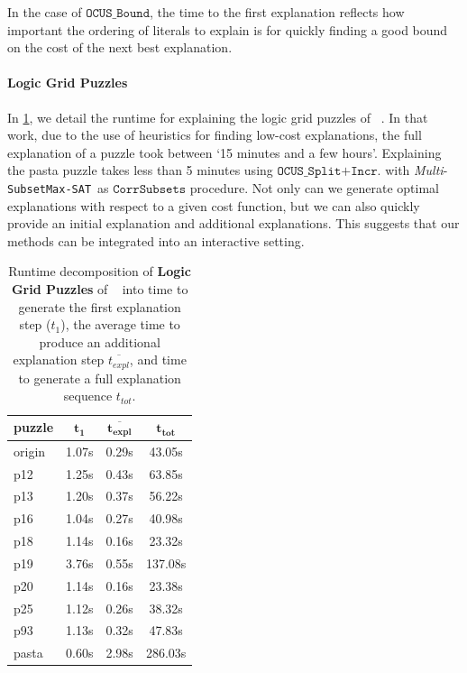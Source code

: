 \documentclass[twoside,11pt]{article}
\newcommand\citet[1]{\citeauthor{#1}~\citeyear{#1}}
\newcommand\mm[1]{\ensuremath{#1}\xspace}
\newcommand\call[1]{\mm{\texttt{#1}}}
\newcommand\subsetmaxsat{\texttt{SubsetMax-SAT}}
\newcommand{\comusbound}{\mm{\call{OCUS\_Bound}}}
\newcommand\ousbiterincr{\mm{\call{OCUS\_Split+Incr.}}}
\newcommand\corrsubsets{\mm{\call{CorrSubsets}}}
\begin{document}
In the case of \emph{\comusbound}, the time to the first explanation reflects how important the ordering of literals to explain is for quickly finding a good bound on the cost of the next best explanation. 

\paragraph{Logic Grid Puzzles} In \cref{tab:indiv-explanations-logic-grid-puzzles}, we detail the runtime for explaining the logic grid puzzles of \citet{ecai/BogaertsGCG20}. 
In that work, due to the use of heuristics for finding low-cost explanations, the full explanation of a puzzle took between `15 minutes and a few hours'. 
Explaining the pasta puzzle takes less than 5 minutes using \ousbiterincr with \emph{Multi}-\subsetmaxsat~as \corrsubsets procedure. 
Not only can we generate optimal explanations with respect to a given cost function, but we can also quickly provide an initial explanation and additional explanations.
This suggests that our methods can be integrated into an interactive setting.

\begin{table}[!h]
	\centering
		\begin{tabular}{l|c|c|c}
			\textbf{puzzle} & $\mathbf{t_1}$ & $\mathbf{\overline{t_{expl}}}$ & $\mathbf{t_{tot}}$ \\
			\hline
			origin &1.07s & 0.29s & 43.05s \\
			p12 & 1.25s & 0.43s & 63.85s \\
			p13 & 1.20s & 0.37s & 56.22s \\
			p16 & 1.04s & 0.27s & 40.98s \\
			p18 & 1.14s & 0.16s & 23.32s \\
			p19 & 3.76s & 0.55s & 137.08s \\
			p20 & 1.14s & 0.16s & 23.38s \\
			p25 & 1.12s & 0.26s & 38.32s \\
			p93 & 1.13s & 0.32s & 47.83s \\
			pasta & 0.60s & 2.98s & 286.03s \\
		\end{tabular}
	\caption{Runtime decomposition of \textbf{Logic Grid Puzzles} of \citet{ecai/BogaertsGCG20} into time to generate the first explanation step ($t_1$), the average time to produce an additional explanation step $\overline{t_{expl}}$, and time to generate a full explanation sequence $t_{tot}$.}
\label{tab:indiv-explanations-logic-grid-puzzles}
\end{table}
\end{document}

